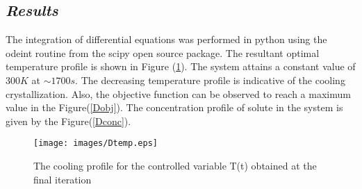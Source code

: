\documentclass[3p,times]{elsarticle}
\begin{document}
\subsection{\textit{Results}}
The integration of differential equations was performed in python using the odeint routine from the scipy open source package.
The resultant optimal temperature profile is shown in Figure (\ref{Dtemp}). The system attains a constant value of $300 K$ at $\sim1700 s$. The decreasing temperature profile is indicative of the cooling crystallization. Also, the objective function can be observed to reach a maximum value in the Figure(\ref{Dobj}). The concentration profile of solute in the system is given by the Figure(\ref{Dconc}). 

\begin{figure}[H] 
\begin{center}
\texttt{[image: images/Dtemp.eps]}
\end{center}
\caption{The cooling profile for the controlled variable T(t) obtained at the final iteration} \label{Dtemp}
\end{figure}
\end{document}
